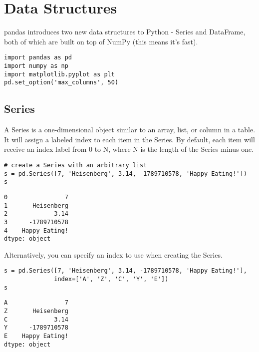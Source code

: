 \documentclass[main.tex]{subfiles}
\begin{document}
\section{Data Structures}

pandas introduces two new data structures to Python - Series and DataFrame, both of which are built on top of NumPy (this means it's fast).

\begin{framed}
\begin{verbatim}
import pandas as pd
import numpy as np
import matplotlib.pyplot as plt
pd.set_option('max_columns', 50)
\end{verbatim}
\end{framed}
\subsection{Series}

A Series is a one-dimensional object similar to an array, list, or column in a table. It will assign a labeled index to each item in the Series. By default, each item will receive an index label from 0 to N, where N is the length of the Series minus one.

\begin{framed}
\begin{verbatim}
# create a Series with an arbitrary list
s = pd.Series([7, 'Heisenberg', 3.14, -1789710578, 'Happy Eating!'])
s
\end{verbatim}
\end{framed}
\begin{verbatim}
0                7
1       Heisenberg
2             3.14
3      -1789710578
4    Happy Eating!
dtype: object
\end{verbatim}
Alternatively, you can specify an index to use when creating the Series.

\begin{framed}
\begin{verbatim}
s = pd.Series([7, 'Heisenberg', 3.14, -1789710578, 'Happy Eating!'],
              index=['A', 'Z', 'C', 'Y', 'E'])
s
\end{verbatim}
\end{framed}
\begin{verbatim}
A                7
Z       Heisenberg
C             3.14
Y      -1789710578
E    Happy Eating!
dtype: object
\end{verbatim}
\end{document}
